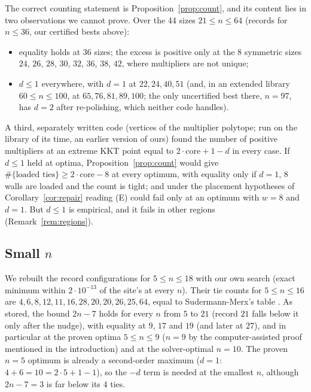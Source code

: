 \documentclass[11pt]{amsart}
\theoremstyle{definition}
\newcommand{\core}{\mathrm{core}}
\begin{document}
The correct counting statement is Proposition~\ref{prop:count}, and its content lies in two observations we cannot prove. Over the 44 sizes $21 \le n \le 64$ (records for $n \le 36$, our certified bests above): %
\begin{itemize}
\item equality holds at 36 sizes; the excess is positive only at the 8 symmetric sizes $24$, $26$, $28$, $30$, $32$, $36$, $38$, $42$, where multipliers are not unique;
\item $d \le 1$ everywhere, with $d = 1$ at $22, 24, 40, 51$ (and, in an extended library $60 \le n \le 100$, at $65, 76, 81, 89, 100$; the only uncertified best there, $n = 97$, has $d = 2$ after re-polishing, which neither code handles).
\end{itemize}
A third, separately written code (vertices of the multiplier polytope; run on the library of its time, an earlier version of ours) found the number of positive multipliers at an extreme KKT point equal to $2\cdot\core + 1 - d$ in every case. %
If $d \le 1$ held at optima, Proposition~\ref{prop:count} would give $\#\{\text{loaded ties}\} \ge 2\cdot\core - 8$ at every optimum, with equality only if $d = 1$, 8 walls are loaded and the count is tight; and under the placement hypotheses of Corollary~\ref{cor:repair} reading (E) could fail only at an optimum with $w = 8$ and $d = 1$. But $d \le 1$ is empirical, and it fails in other regions (Remark~\ref{rem:regions}).

\subsection{Small \texorpdfstring{$n$}{n}}\label{sec:small}
We rebuilt the record configurations for $5 \le n \le 18$ with our own search (exact minimum within $2\cdot10^{-13}$ of the site's at every $n$). Their tie counts for $5 \le n \le 16$ are $4, 6, 8, 12, 11, 16, 28, 20, 20, 26, 25, 64$, equal to Sudermann-Merx's table \cite[Table~10]{SM}. As stored, the bound $2n-7$ holds for every $n$ from $5$ to $21$ (record $21$ falls below it only after the nudge), with equality at $9$, $17$ and $19$ (and later at $27$), and in particular at the proven optima $5 \le n \le 9$ ($n = 9$ by the computer-assisted proof mentioned in the introduction) and at the solver-optimal $n = 10$. The proven $n = 5$ optimum is already a second-order maximum ($d = 1$: $4 + 6 = 10 = 2\cdot5 + 1 - 1$), so the $-d$ term is needed at the smallest $n$, although $2n-7 = 3$ is far below its 4 ties. %
\end{document}
